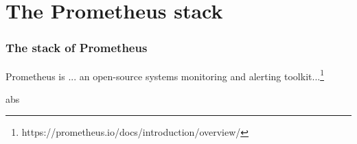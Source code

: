 \section{The Prometheus stack}
\begin{frame}
  \frametitle{The stack of Prometheus}   
  \begin{block}{Prometheus is ...}
    an open-source systems monitoring and alerting toolkit...\footnote{https://prometheus.io/docs/introduction/overview/}
  \end{block}
  
  \begin{Definition}
  abs
  \end{Definition}
 
  
\end{frame}


